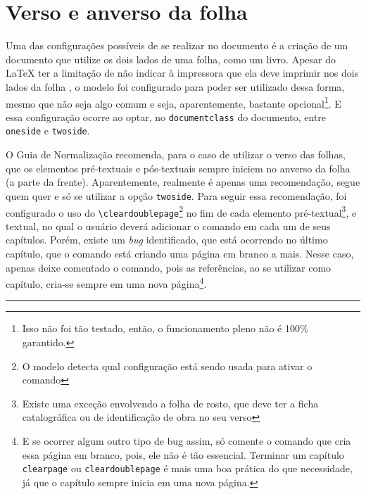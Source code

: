\section{Verso e anverso da folha}
Uma das configurações possíveis de se realizar no documento é a criação de um documento que utilize os dois lados de uma folha, como um livro. Apesar do \LaTeX{} ter a limitação de não indicar à impressora que ela deve imprimir nos dois lados da folha \cite{site:latex-impressora}, o modelo foi configurado para poder ser utilizado dessa forma, mesmo que não seja algo comum e seja, aparentemente, bastante opcional\footnote{Isso não foi tão testado, então, o funcionamento pleno não é 100\% garantido.}. E essa configuração ocorre ao optar, no \texttt{documentclass} do documento, entre \texttt{oneside} e \texttt{twoside}.

O Guia de Normalização recomenda, para o caso de utilizar o verso das folhas, que os elementos pré-textuais e pós-textuais sempre iniciem no anverso da folha (a parte da frente). Aparentemente, realmente é apenas uma recomendação, segue quem quer e só se utilizar a opção \texttt{twoside}. Para seguir essa recomendação, foi configurado o uso do \verb|\cleardoublepage|\footnote{O modelo detecta qual configuração está sendo usada para ativar o comando} no fim de cada elemento pré-textual\footnote{Existe uma exceção envolvendo a folha de rosto, que deve ter a ficha catalográfica ou de identificação de obra no seu verso}, e textual, no qual o usuário deverá adicionar o comando em cada um de seus capítulos. Porém, existe um \textit{bug} identificado, que está ocorrendo no último capítulo, que o comando está criando uma página em branco a mais. Nesse caso, apenas deixe comentado o comando, pois as referências, ao se utilizar como capítulo, cria-se sempre em uma nova página\footnote{E se ocorrer algum outro tipo de bug assim, só comente o comando que cria essa página em branco, pois, ele não é tão essencial. Terminar um capítulo \texttt{clearpage} ou \texttt{cleardoublepage} é mais uma boa prática do que necessidade, já que o capítulo sempre inicia em uma nova página.}.


\vspace{\baselineskip}
\begin{Center}
    \rule{12cm}{1pt}
\end{Center}

